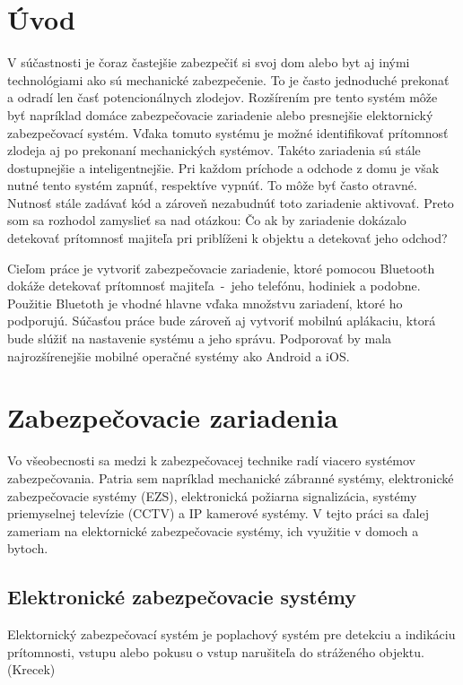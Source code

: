 \chapter{Úvod}

V súčastnosti je čoraz častejšie zabezpečiť si svoj dom alebo byt aj inými technológiami ako sú mechanické zabezpečenie. To je často jednoduché prekonať a odradí len časť potencionálnych zlodejov. Rozšírením pre tento systém môže byť napríklad domáce zabezpečovacie zariadenie alebo presnejšie elektornický zabezpečovací systém. Vďaka tomuto systému je možné identifikovať prítomnosť zlodeja aj po prekonaní mechanických systémov. Takéto zariadenia sú stále dostupnejšie a inteligentnejšie. Pri každom príchode a odchode z domu je však nutné tento systém zapnúť, respektíve vypnúť. To môže byť často otravné. Nutnosť stále zadávať kód a zároveň nezabudnúť toto zariadenie aktivovať. Preto som sa rozhodol zamyslieť sa nad otázkou: Čo ak by zariadenie dokázalo detekovať prítomnosť majiteľa pri priblíženi k objektu a detekovať jeho odchod?

Cieľom práce je vytvoriť zabezpečovacie zariadenie, ktoré pomocou Bluetooth dokáže detekovať prítomnosť majiteľa~-~jeho telefónu, hodiniek a podobne. Použitie Bluetoth je vhodné hlavne vďaka množstvu zariadení, ktoré ho podporujú.
Súčasťou práce bude zároveň aj vytvoriť mobilnú aplákaciu, ktorá bude slúžiť na nastavenie systému a jeho správu. Podporovať by mala najrozšírenejšie mobilné operačné systémy ako Android a iOS.

\chapter{Zabezpečovacie zariadenia}

Vo všeobecnosti sa medzi k zabezpečovacej technike radí viacero systémov zabezpečovania. Patria sem napríklad mechanické zábranné systémy, elektronické zabezpečovacie systémy (EZS), elektronická požiarna signalizácia, systémy priemyselnej televízie (CCTV) a IP kamerové systémy. V tejto práci sa ďalej zameriam na elektornické zabezpečovacie systémy, ich využitie v domoch a bytoch.

\section{Elektronické zabezpečovacie systémy}

Elektornický zabezpečovací systém je poplachový systém pre detekciu a indikáciu prítomnosti, vstupu alebo pokusu o vstup narušiteľa do stráženého objektu. (Krecek) 

